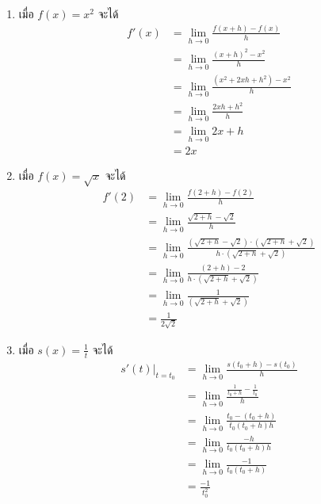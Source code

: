 \documentclass[
]{book}
\begin{document}
\begin{enumerate}
\def\labelenumi{(\arabic{enumi})}
\item
  เมื่อ \(f(x) = x^2\) จะได้ \begin{equation}   \begin{aligned}
              f'(x) &= \underset{h \rightarrow 0}{\lim}\frac{f(x+h) - f(x)}{h} \\
                  &= \underset{h \rightarrow 0}{\lim}\frac{(x+h)^2-x^2}{h} \\
                  &= \underset{h \rightarrow 0}{\lim}\frac{(x^2+2xh+h^2)-x^2}{h} \\
                  &= \underset{h \rightarrow 0}{\lim}\frac{2xh+h^2}{h} \\
                  &= \underset{h \rightarrow 0}{\lim}2x + h \\
                  &= 2x
    \end{aligned} \end{equation}
\item
  เมื่อ \(f(x) = \sqrt{x}\) จะได้ \begin{equation}   \begin{aligned}
              f'(2) &= \underset{h \rightarrow 0}{\lim}\frac{f(2+h) - f(2)}{h} \\
                  &= \underset{h \rightarrow 0}{\lim}\frac{\sqrt{2+h} - \sqrt{2}}{h} \\
                  &= \underset{h \rightarrow 0}{\lim}\frac{(\sqrt{2+h} - \sqrt{2}) \cdot
                  (\sqrt{2+h} + \sqrt{2})}{h \cdot (\sqrt{2+h} + \sqrt{2})} \\
                  &= \underset{h \rightarrow 0}{\lim}\frac{(2+h)-2}{h\cdot (\sqrt{2+h} + \sqrt{2})} \\
                  &= \underset{h \rightarrow 0}{\lim}\frac{1}{(\sqrt{2+h} + \sqrt{2})} \\
                  &= \frac{1}{2\sqrt{2}}
    \end{aligned} \end{equation}
\item
  เมื่อ \(s(x) = \frac{1}{t}\) จะได้ \begin{equation}   \begin{aligned}
              s'(t)|_{t=t_0} &= \underset{h \rightarrow 0}{\lim}\frac{s(t_0+h) - s(t_0)}{h} \\
                  &= \underset{h \rightarrow 0}{\lim}\frac{\frac{1}{t_0+h}-\frac{1}{t_0}}{h} \\
                  &= \underset{h \rightarrow 0}{\lim}\frac{t_0-(t_0+h)}{t_0(t_0+h)h} \\
                  &= \underset{h \rightarrow 0}{\lim}\frac{-h}{t_0(t_0+h)h} \\
                  &= \underset{h \rightarrow 0}{\lim}\frac{-1}{t_0(t_0+h)} \\
                  &= \frac{-1}{t_0^2}
    \end{aligned} \end{equation}
\end{enumerate}
\end{document}
